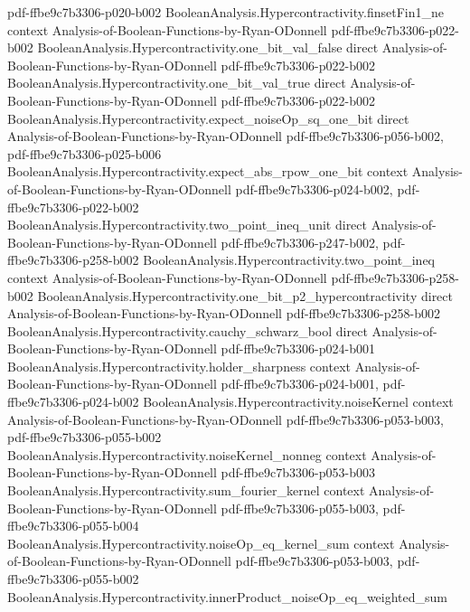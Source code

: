 \begin{theorem}
  {pdf-ffbe9c7b3306-p020-b002}
\proofstep
  {BooleanAnalysis.Hypercontractivity.finsetFin1_ne}
  {context}
  {Analysis-of-Boolean-Functions-by-Ryan-ODonnell}
  {pdf-ffbe9c7b3306-p022-b002}
\proofstep
  {BooleanAnalysis.Hypercontractivity.one_bit_val_false}
  {direct}
  {Analysis-of-Boolean-Functions-by-Ryan-ODonnell}
  {pdf-ffbe9c7b3306-p022-b002}
\proofstep
  {BooleanAnalysis.Hypercontractivity.one_bit_val_true}
  {direct}
  {Analysis-of-Boolean-Functions-by-Ryan-ODonnell}
  {pdf-ffbe9c7b3306-p022-b002}
\proofstep
  {BooleanAnalysis.Hypercontractivity.expect_noiseOp_sq_one_bit}
  {direct}
  {Analysis-of-Boolean-Functions-by-Ryan-ODonnell}
  {pdf-ffbe9c7b3306-p056-b002,
    pdf-ffbe9c7b3306-p025-b006}
\proofstep
  {BooleanAnalysis.Hypercontractivity.expect_abs_rpow_one_bit}
  {context}
  {Analysis-of-Boolean-Functions-by-Ryan-ODonnell}
  {pdf-ffbe9c7b3306-p024-b002,
    pdf-ffbe9c7b3306-p022-b002}
\proofstep
  {BooleanAnalysis.Hypercontractivity.two_point_ineq_unit}
  {direct}
  {Analysis-of-Boolean-Functions-by-Ryan-ODonnell}
  {pdf-ffbe9c7b3306-p247-b002,
    pdf-ffbe9c7b3306-p258-b002}
\proofstep
  {BooleanAnalysis.Hypercontractivity.two_point_ineq}
  {context}
  {Analysis-of-Boolean-Functions-by-Ryan-ODonnell}
  {pdf-ffbe9c7b3306-p258-b002}
\proofstep
  {BooleanAnalysis.Hypercontractivity.one_bit_p2_hypercontractivity}
  {direct}
  {Analysis-of-Boolean-Functions-by-Ryan-ODonnell}
  {pdf-ffbe9c7b3306-p258-b002}
\proofstep
  {BooleanAnalysis.Hypercontractivity.cauchy_schwarz_bool}
  {direct}
  {Analysis-of-Boolean-Functions-by-Ryan-ODonnell}
  {pdf-ffbe9c7b3306-p024-b001}
\proofstep
  {BooleanAnalysis.Hypercontractivity.holder_sharpness}
  {context}
  {Analysis-of-Boolean-Functions-by-Ryan-ODonnell}
  {pdf-ffbe9c7b3306-p024-b001,
    pdf-ffbe9c7b3306-p024-b002}
\proofstep
  {BooleanAnalysis.Hypercontractivity.noiseKernel}
  {context}
  {Analysis-of-Boolean-Functions-by-Ryan-ODonnell}
  {pdf-ffbe9c7b3306-p053-b003,
    pdf-ffbe9c7b3306-p055-b002}
\proofstep
  {BooleanAnalysis.Hypercontractivity.noiseKernel_nonneg}
  {context}
  {Analysis-of-Boolean-Functions-by-Ryan-ODonnell}
  {pdf-ffbe9c7b3306-p053-b003}
\proofstep
  {BooleanAnalysis.Hypercontractivity.sum_fourier_kernel}
  {context}
  {Analysis-of-Boolean-Functions-by-Ryan-ODonnell}
  {pdf-ffbe9c7b3306-p055-b003,
    pdf-ffbe9c7b3306-p055-b004}
\proofstep
  {BooleanAnalysis.Hypercontractivity.noiseOp_eq_kernel_sum}
  {context}
  {Analysis-of-Boolean-Functions-by-Ryan-ODonnell}
  {pdf-ffbe9c7b3306-p053-b003,
    pdf-ffbe9c7b3306-p055-b002}
\proofstep
  {BooleanAnalysis.Hypercontractivity.innerProduct_noiseOp_eq_weighted_sum}

\end{theorem}
